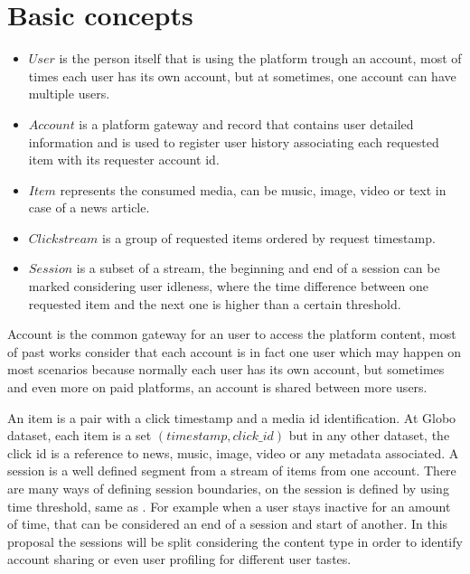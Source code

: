 \documentclass[ecp,tc,english]{iiufrgs}
\begin{document}
    \section{Basic concepts}
        
        \begin{itemize}
            \item \(User\) is the person itself that is using the platform trough an account, most of times each user has its own account, but at sometimes, one account can have multiple users.        
            \item \(Account\) is a platform gateway and record that contains user detailed information and is used to register user history associating each requested item with its requester account id.
            \item \(Item\) represents the consumed media, can be music, image, video or text in case of a news article.
            \item \(Clickstream\) is a group of requested items ordered by request timestamp.    
            \item \(Session\) is a subset of a stream, the beginning and end of a session can be marked considering user idleness, where the time difference between one requested item and the next one is higher than a certain threshold.
        \end{itemize}

        Account is the common gateway for an user to access the platform content, most of past works consider that each account is in fact one user which may happen on most scenarios because normally each user has its own account, but sometimes and even more on paid platforms, an account is shared between more users.
    
        An item is a pair with a click timestamp and a media id identification. 
        At Globo dataset, each item is a  set \((timestamp, click\_id)\) but 
        in any other dataset, the click id is a reference to news, music, 
        image, video or any metadata associated. A session is a well defined 
        segment from a stream of items from one account. There are many ways 
        of defining session boundaries, on \cite{10.1145/362883.362920} the session 
        is defined by using time threshold, same as \cite{10.1145/2736277.2741117}. 
        For example when a user stays inactive for an amount of time, that can be 
        considered an end of a session and start of another. In this proposal the 
        sessions will be split considering the content type in order to identify 
        account sharing or even user profiling for different user tastes.
\end{document}
